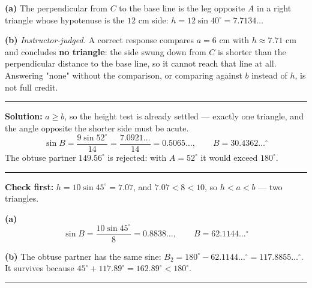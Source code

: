 \documentclass[12pt]{article}
\begin{document}



\textbf{(a)} The perpendicular from $C$ to the base line is the leg opposite $A$ in a right triangle whose hypotenuse is the $12$ cm side:
$h = 12\sin 40^\circ = 7.7134\ldots$ 

\textbf{(b)} \emph{Instructor-judged.} A correct response compares $a = 6$ cm with $h \approx 7.71$ cm and concludes \textbf{no triangle}: the side swung down from $C$ is shorter than the perpendicular distance to the base line, so it cannot reach that line at all. Answering "none" without the comparison, or comparing against $b$ instead of $h$, is not full credit.

\vspace{0.1cm}\noindent\rule{\linewidth}{0.2pt}\vspace{0.1cm}


\textbf{Solution:} $a \ge b$, so the height test is already settled --- exactly one triangle, and the angle opposite the shorter side must be acute.
\[ \sin B = \frac{9\sin 52^\circ}{14} = \frac{7.0921\ldots}{14} = 0.5065\ldots, \qquad B = 30.4362\ldots^\circ \]
The obtuse partner $149.56^\circ$ is rejected: with $A = 52^\circ$ it would exceed $180^\circ$. 

\vspace{0.1cm}\noindent\rule{\linewidth}{0.2pt}\vspace{0.1cm}


\textbf{Check first:} $h = 10\sin 45^\circ = 7.07$, and $7.07 < 8 < 10$, so $h < a < b$ --- two triangles.

\textbf{(a)} \[ \sin B = \frac{10\sin 45^\circ}{8} = 0.8838\ldots, \qquad B = 62.1144\ldots^\circ \]

\textbf{(b)} The obtuse partner has the same sine: $B_2 = 180^\circ - 62.1144\ldots^\circ = 117.8855\ldots^\circ$. It survives because $45^\circ + 117.89^\circ = 162.89^\circ < 180^\circ$. 

\vspace{0.1cm}\noindent\rule{\linewidth}{0.2pt}\vspace{0.1cm}
\end{document}
